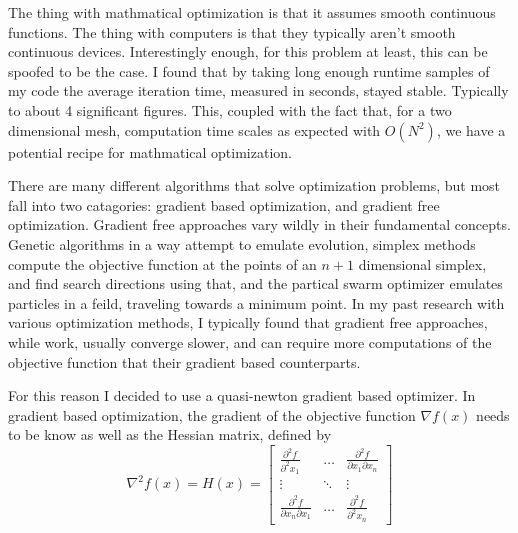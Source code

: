 \documentclass[12pt,parskip=full]{article}
\numberwithin{subsection}{section}
\begin{document}
		The thing with mathmatical optimization is that it assumes smooth continuous functions. The thing with computers is that they
		typically aren't smooth continuous devices. Interestingly enough, for this problem at least, this can be spoofed to be the case.
		I found that by taking long enough runtime samples of my code the average iteration time, measured in seconds, stayed stable.
		Typically to about 4 significant figures. This, coupled with the fact that, for a two dimensional mesh, computation time scales
		as expected with $O(N^2)$, we have a potential recipe for mathmatical optimization. 

		There are many different algorithms that solve optimization problems, but most fall into two catagories: gradient based optimization,
		and gradient free optimization. Gradient free approaches vary wildly in their fundamental concepts. Genetic algorithms in a way
		attempt to emulate evolution, simplex methods compute the objective function at the points of an $n + 1$ dimensional simplex, and
		find search directions using that, and the partical swarm optimizer emulates particles in a feild, traveling towards a minimum point.
		In my past research with various optimization methods, I typically found that gradient free approaches, while work, usually converge
		slower, and can require more computations of the objective function that their gradient based counterparts.

		For this reason I decided to use a quasi-newton gradient based optimizer. In gradient based optimization, the gradient of the objective
		function $\nabla f(x)$ needs to be know as well as the Hessian matrix, defined by
		\begin{equation}
			\nabla^2 f(x) = H(x) = \begin{bmatrix}
				\frac{\partial^2 f}{\partial^2 x_1} & \dots & \frac{\partial^2 f}{\partial x_1 \partial x_n} \\
				\vdots & \ddots & \vdots \\
				\frac{\partial^2 f}{\partial x_n \partial x_1} & \dots & \frac{\partial^2 f}{\partial^2 x_n}
			\end{bmatrix}
		\end{equation}
\end{document}
